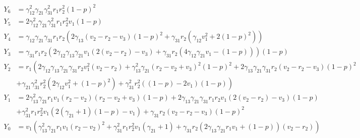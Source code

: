 \begin{align*}
    Y_6 &= \gamma_{12}^2\gamma_{21}\gamma_{31}^2r_1r_2^2\left(1-p\right)^2\\
    Y_5 &= 2\gamma_{12}^2\gamma_{21}\gamma_{31}^2r_1r_2^2v_1\left(1-p\right)\\
    Y_4 &= \gamma_{12}\gamma_{21}\gamma_{31}r_1r_2\left(2\gamma_{13}\left(v_2-r_2-v_3\right)\left(1-p\right)^2+\gamma_{31}r_2\left(\gamma_{12}v_1^2+2\left(1-p\right)^2\right)\right)\\
    Y_3 &= \gamma_{31}r_1r_2\left(2\gamma_{12}\gamma_{13}\gamma_{21}v_1\left(2\left(v_2-r_2\right)-v_3\right)+\gamma_{31}r_2\left(4\gamma_{12}\gamma_{21}v_1-\left(1-p\right)\right)\right)\left(1-p\right)\\
    Y_2 &= r_1\left(2\gamma_{12}\gamma_{13}\gamma_{21}\gamma_{31}r_2v_1^2\left(v_2-r_2\right)+\gamma_{13}^2\gamma_{21}\left(r_2-v_2+v_3\right)^2\left(1-p\right)^2+2\gamma_{13}\gamma_{21}\gamma_{31}r_2\left(v_2-r_2-v_3\right)\left(1-p\right)^2\right.\\
    &\left.+\gamma_{21}\gamma_{31}^2r_2^2\left(2\gamma_{12}v_1^2+\left(1-p\right)^2\right)+\gamma_{31}^2r_2^2\left(\left(1-p\right)-2v_1\right)\left(1-p\right)\right)\\
    Y_1 &= 2\gamma_{13}^2\gamma_{21}r_1v_1\left(r_2-v_2\right)\left(r_2-v_2+v_3\right)\left(1-p\right)+2\gamma_{13}\gamma_{21}\gamma_{31}r_1r_2v_1\left(2\left(v_2-r_2\right)-v_3\right)\left(1-p\right)\\
    &+\gamma_{31}^2r_1r_2^2v_1\left(2\left(\gamma_{21}+1\right)\left(1-p\right)-v_1\right)+\gamma_{31}r_2\left(v_2-r_2-v_3\right)\left(1-p\right)^2\\
    Y_0 &= v_1\left(\gamma_{13}^2\gamma_{21}r_1v_1\left(r_2-v_2\right)^2+\gamma_{31}^2r_1r_2^2v_1\left(\gamma_{21}+1\right)+\gamma_{31}r_2\left(2\gamma_{13}\gamma_{21}r_1v_1+\left(1-p\right)\right)\left(v_2-r_2\right)\right)
\end{align*}

